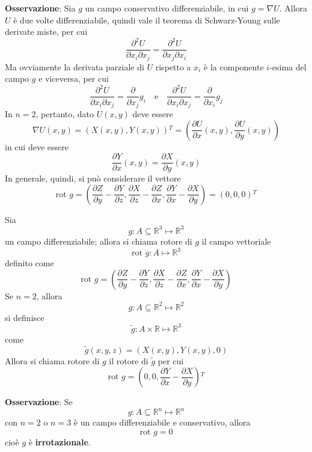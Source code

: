 \documentclass[a4paper]{extarticle}
\begin{document}
\vspace{2em}
\noindent
\textbf{Osservazione}: Sia $g$ un campo conservativo differenziabile, in cui $g=\nabla U$. Allora $U$ è due volte differenziabile, quindi vale il teorema di Schwarz-Young sulle derivate miste, per cui
\[\dfrac{\partial^2 U}{\partial x_i \partial x_j} = \dfrac{\partial^2 U}{\partial x_j \partial x_i}\]
Ma ovviamente la derivata parziale di $U$ rispetto a $x_i$ è la componente $i$-esima del campo $g$ e viceversa, per cui
\[\frac{\partial^2 U}{\partial x_i \partial x_j} = \frac{\partial}{\partial x_j} g_i \hspace{1em} \text{e} \hspace{1em} \frac{\partial^2 U}{\partial x_i \partial x_j} = \frac{\partial}{\partial x_i} g_j\]
In $n=2$, pertanto, dato $U(x,y)$ deve essere
\[\nabla U(x,y) = \left(X(x,y), Y(x,y)\right){^T} = \left(\dfrac{\partial U}{\partial x}(x,y), \frac{\partial U}{\partial y} (x,y)\right)\]
in cui deve essere
\[\dfrac{\partial Y}{\partial x}(x,y) = \dfrac{\partial X}{\partial y}(x,y)\]
In generale, quindi, si può considerare il vettore
\[\text{rot }g = \left(\dfrac{\partial Z}{\partial y} - \frac{\partial Y}{\partial z}, \frac{\partial X}{\partial z} - \frac{\partial Z}{\partial x}, \frac{\partial Y}{\partial x}-\frac{\partial X}{\partial y}\right) = (0,0,0){^T}\]

Sia
\[g : A \subseteq \mathbb{R}^3 \longmapsto \mathbb{R}^3\]
un campo differenziabile; allora si chiama rotore di $g$ il campo vettoriale
\[\text{rot } g : A \longmapsto \mathbb{R}^3\]
definito come
\[\text{rot }g = \left(\dfrac{\partial Z}{\partial y} - \frac{\partial Y}{\partial z}, \frac{\partial X}{\partial z} - \frac{\partial Z}{\partial x}, \frac{\partial Y}{\partial x}-\frac{\partial X}{\partial y}\right)\]
Se $n=2$, allora
\[g : A \subseteq \mathbb{R}^2 \longmapsto \mathbb{R}^2\]
si definisce
\[\widetilde{g} : A \times \mathbb{R} \longmapsto \mathbb{R}^3\]
come
\[\widetilde{g}(x,y,z) = \left(X(x,y),Y(x,y),0\right)\]
Allora si chiama rotore di $g$ il rotore di $\widetilde{g}$ per cui
\[\text{rot }g = \left(0,0,\dfrac{\partial Y}{\partial x} - \frac{\partial X}{\partial y}\right){^T}\]

\vspace{2em}
\noindent
\textbf{Osservazione}: Se
\[g : A \subseteq \mathbb{R}^n \longmapsto \mathbb{R}^n\]
con $n=2$ o $n=3$ è un campo differenziabile e conservativo, allora
\[\text{rot } g = 0\]
cioè $g$ è \textbf{irrotazionale}.
\end{document}
